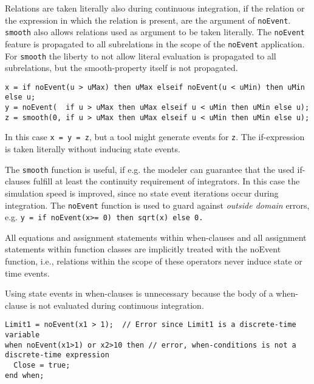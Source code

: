 Relations are taken literally also during continuous integration, if the
relation or the expression in which the relation is present, are the
argument of \lstinline!noEvent!. \lstinline!smooth! also
allows relations used as argument to be taken literally. The \lstinline!noEvent!
feature is propagated to all subrelations in the scope of the \lstinline!noEvent!
application. For \lstinline!smooth! the liberty to not allow literal evaluation is
propagated to all subrelations, but the smooth-property itself is not
propagated.

\begin{example}
\begin{lstlisting}[language=modelica]
x = if noEvent(u > uMax) then uMax elseif noEvent(u < uMin) then uMin else u;
y = noEvent(  if u > uMax then uMax elseif u < uMin then uMin else u);
z = smooth(0, if u > uMax then uMax elseif u < uMin then uMin else u);
\end{lstlisting}

In this case \lstinline!x = y = z!, but a tool might generate events for \lstinline!z!. The
if-expression is taken literally without inducing state events.

The \lstinline!smooth! function is useful, if e.g. the modeler can guarantee that
the used if-clauses fulfill at least the continuity requirement of
integrators. In this case the simulation speed is improved, since no
state event iterations occur during integration. The \lstinline!noEvent! function is
used to guard against \emph{outside domain} errors, e.g. \lstinline!y = if noEvent(x>= 0) then sqrt(x) else 0.!
\end{example}

All equations and assignment statements within when-clauses and all
assignment statements within function classes are implicitly treated
with the noEvent function, i.e., relations within the scope of these
operators never induce state or time events.

\begin{nonnormative}
Using state events in when-clauses is unnecessary because the body of a when-clause is not evaluated during continuous integration.
\end{nonnormative}

\begin{example}
\begin{lstlisting}[language=modelica]
Limit1 = noEvent(x1 > 1);  // Error since Limit1 is a discrete-time variable
when noEvent(x1>1) or x2>10 then // error, when-conditions is not a discrete-time expression
  Close = true;
end when;
\end{lstlisting}
\end{example}

